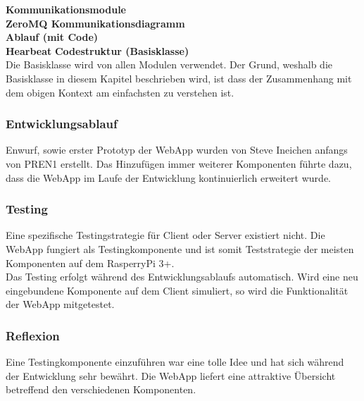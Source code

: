 \documentclass[../../main.tex]{subfiles}
\begin{document}
\textbf{Kommunikationsmodule} \\
\textbf{ZeroMQ Kommunikationsdiagramm} \\
\textbf{Ablauf (mit Code)} \\
\textbf{Hearbeat}
\textbf{Codestruktur (Basisklasse)} \\
Die Basisklasse wird von allen Modulen verwendet. Der Grund, weshalb die Basisklasse in diesem Kapitel beschrieben wird, ist dass der Zusammenhang mit dem obigen Kontext am einfachsten zu verstehen ist.

\subsubsection{Entwicklungsablauf}
Enwurf, sowie erster Prototyp der WebApp wurden von Steve Ineichen anfangs von PREN1 erstellt. Das Hinzufügen immer weiterer Komponenten führte dazu, dass die WebApp im Laufe der Entwicklung kontinuierlich erweitert wurde.

\subsubsection{Testing}
Eine spezifische Testingstrategie für Client oder Server existiert nicht. Die WebApp fungiert als Testingkomponente und ist somit Teststrategie der meisten Komponenten auf dem RasperryPi 3+.
\\
Das Testing erfolgt während des Entwicklungsablaufs automatisch. Wird eine neu eingebundene Komponente auf dem Client simuliert, so wird die Funktionalität der WebApp mitgetestet.

\subsubsection{Reflexion}
Eine Testingkomponente einzuführen war eine tolle Idee und hat sich während der Entwicklung sehr bewährt. Die WebApp liefert eine attraktive Übersicht betreffend den verschiedenen Komponenten.
\end{document}
